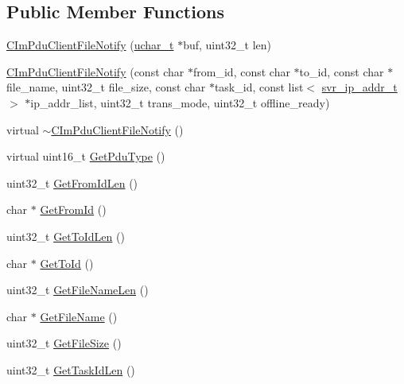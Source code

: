 \subsection*{Public Member Functions}
\begin{DoxyCompactItemize}
\item 
\hyperlink{class_c_im_pdu_client_file_notify_a22707c00a7bd5a6d2efe953bfea8da24}{C\+Im\+Pdu\+Client\+File\+Notify} (\hyperlink{base_2ostype_8h_a124ea0f8f4a23a0a286b5582137f0b8d}{uchar\+\_\+t} $\ast$buf, uint32\+\_\+t len)
\item 
\hyperlink{class_c_im_pdu_client_file_notify_af6d6011ad8375885f83192fc4410a8f1}{C\+Im\+Pdu\+Client\+File\+Notify} (const char $\ast$from\+\_\+id, const char $\ast$to\+\_\+id, const char $\ast$file\+\_\+name, uint32\+\_\+t file\+\_\+size, const char $\ast$task\+\_\+id, const list$<$ \hyperlink{structsvr__ip__addr__t}{svr\+\_\+ip\+\_\+addr\+\_\+t} $>$ $\ast$ip\+\_\+addr\+\_\+list, uint32\+\_\+t trans\+\_\+mode, uint32\+\_\+t offline\+\_\+ready)
\item 
virtual \hyperlink{class_c_im_pdu_client_file_notify_a4542b006f6075c02a8a0238227f3404d}{$\sim$\+C\+Im\+Pdu\+Client\+File\+Notify} ()
\item 
virtual uint16\+\_\+t \hyperlink{class_c_im_pdu_client_file_notify_a80548a4c42cbe8f543b87650a1ebb289}{Get\+Pdu\+Type} ()
\item 
uint32\+\_\+t \hyperlink{class_c_im_pdu_client_file_notify_a73c6c446555ce58bd3635d1a44566d78}{Get\+From\+Id\+Len} ()
\item 
char $\ast$ \hyperlink{class_c_im_pdu_client_file_notify_adfb06bd008002d6298c1e18e20a2ee11}{Get\+From\+Id} ()
\item 
uint32\+\_\+t \hyperlink{class_c_im_pdu_client_file_notify_ae2258e6c23edb561553792b3c6c64ea8}{Get\+To\+Id\+Len} ()
\item 
char $\ast$ \hyperlink{class_c_im_pdu_client_file_notify_ae7e59f7626b56565797d69c1b9c019b4}{Get\+To\+Id} ()
\item 
uint32\+\_\+t \hyperlink{class_c_im_pdu_client_file_notify_aff44f48b8fe33fde474f4250db3b74ac}{Get\+File\+Name\+Len} ()
\item 
char $\ast$ \hyperlink{class_c_im_pdu_client_file_notify_a4babd3dd7a87e36c62fc52c5efc4c2d8}{Get\+File\+Name} ()
\item 
uint32\+\_\+t \hyperlink{class_c_im_pdu_client_file_notify_af00a0eeca52af630a54ad270cc7db333}{Get\+File\+Size} ()
\item 
uint32\+\_\+t \hyperlink{class_c_im_pdu_client_file_notify_a6eb32a505e8b33ee12284d9e4e14fc39}{Get\+Task\+Id\+Len} ()

\end{DoxyCompactItemize}
